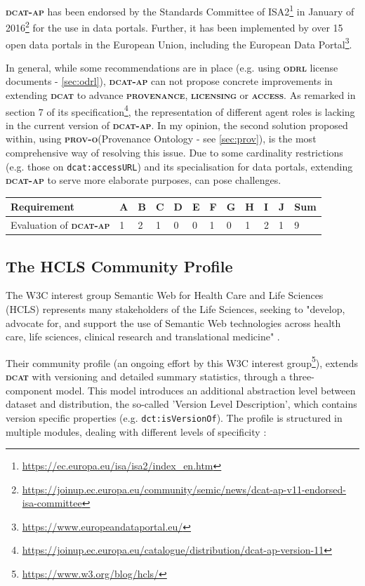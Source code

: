 \documentclass[a4paper,english,twoside,BCOR1.5cm,headsepline,DIV12,appendixprefix,final,12pt]{scrbook}
\newcommand{\provenance}{{\ttfamily\scshape\bfseries provenance}\xspace}
\newcommand{\licensing}{{\ttfamily\scshape\bfseries licensing}\xspace}
\newcommand{\access}{{\ttfamily\scshape\bfseries access}\xspace}
\newcommand{\odrl}{{\scshape\bfseries odrl}\xspace}
\newcommand{\prov}{{\scshape\bfseries prov-o}\xspace}
\newcommand{\dcat}{{\scshape\bfseries dcat}\xspace}
\newcommand{\dcatap}{{\scshape\bfseries dcat-ap}\xspace}
\newcommand{\prop}[1]{{{\texttt{#1}}}}
\newcommand\footnoteurl[1]{\footnote{\scriptsize\url{#1}}}
\begin{document}
\dcatap has been endorsed by the Standards Committee of ISA2\footnoteurl{https://ec.europa.eu/isa/isa2/index_en.htm} in January of 2016\footnoteurl{https://joinup.ec.europa.eu/community/semic/news/dcat-ap-v11-endorsed-isa-committee} for the use in data portals. Further, it has been implemented by over 15 open data portals in the European Union, including the European Data Portal\footnoteurl{https://www.europeandataportal.eu/}. 

In general, while some recommendations are in place (e.g. using \odrl license documents - \cref{sec:odrl}), \dcatap can not propose concrete improvements in extending \dcat to advance \provenance, \licensing or \access. As remarked in section 7 of its specification\footnoteurl{https://joinup.ec.europa.eu/catalogue/distribution/dcat-ap-version-11}, the representation of different agent roles is lacking in the current version of \dcatap. In my opinion, the second solution proposed within, using \prov (Provenance Ontology - see \cref{sec:prov}), is the most comprehensive way of resolving this issue. Due to some cardinality restrictions (e.g. those on \prop{dcat:accessURL}) and its specialisation for data portals, extending \dcatap to serve more elaborate purposes, can pose challenges. 

\begin{table}[!htbp]
    \centering
    \begin{tabular}{|l|l|l|l|l|l|l|l|l|l|l|l|}
        \hline
        Requirement & A & B & C & D & E & F & G & H & I & J & Sum \\
        \hline
        Evaluation of \dcatap & 1 & 2 & 1 & 0 & 0 & 1 & 0 & 1 & 2 & 1 & 9 \\
        \hline
    \end{tabular}
    \label{tab:evaldcatap}
\end{table}

\subsection{The HCLS Community Profile}
\label{sec:hcls}
The W3C interest group Semantic Web for Health Care and Life Sciences (HCLS)  represents many stakeholders of the Life Sciences, seeking to "develop, advocate for, and support the use of Semantic Web technologies across health care, life sciences, clinical research and translational medicine" \cite{hclsig}. 

Their community profile (an ongoing effort by this W3C interest group\footnoteurl{https://www.w3.org/blog/hcls/}), extends \dcat with versioning and detailed summary statistics, through a three-component model. This model introduces an additional abstraction level between dataset and distribution, the so-called 'Version Level Description', which contains version specific properties (e.g. \prop{dct:isVersionOf}). The profile is structured in multiple modules, dealing with different levels of specificity \cite{HCLSCP2016}:
\end{document}
